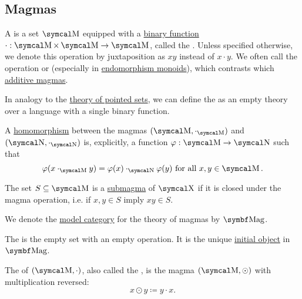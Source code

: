 \subsection{Magmas}\label{subsec:magmas}

\begin{definition}\label{def:magma}
  A  is a set \( \CM \) equipped with a \hyperref[def:function/arity]{binary function} \( \cdot: \CM \times \CM \to \CM \), called the . Unless specified otherwise, we denote this operation by juxtaposition as \( xy \) instead of \( x \cdot y \). We often call the operation  or  (especially in \hyperref[def:endomorphism_monoid]{endomorphism monoids}), which contrasts which \hyperref[remark:additive_magma]{additive magmas}.

  \begin{DefEnum}
     In analogy to the \hyperref[def:pointed_set/theory]{theory of pointed sets}, we can define the  as an empty theory over a language with a single binary function.

     A \hyperref[def:first_order_homomorphism]{homomorphism} between the magmas \( (\CM, \cdot_{\CM}) \) and \( (\CN, \cdot_{\CN}) \) is, explicitly, a function \( \varphi: \CM \to \CN \) such that
    \begin{equation}\label{eq:def:magma/homomorphism}
      \varphi(x \cdot_{\CM} y) = \varphi(x) \cdot_{\CN} \varphi(y) \T{for all} x, y \in \CM.
    \end{equation}

     The set \( S \subseteq \CM \) is a \hyperref[def:first_order_substructure]{submagma} of \( \CX \) if it is closed under the magma operation, i.e. if \( x, y \in S \) imply \( xy \in S \).

     We denote the \hyperref[def:first_order_model_category]{model category} for the theory of magmas by \( \Cat{Mag} \).

     The  is the empty set with an empty operation. It is the unique \hyperref[def:zero_objects/initial]{initial object} in \( \Cat{Mag} \).

     The  of \( (\CM, \cdot) \), also called the , is the magma \( (\CM, \odot) \) with multiplication reversed:
    \begin{equation*}
      x \odot y \coloneqq y \cdot x.
    \end{equation*}


\end{DefEnum}
\end{definition}
